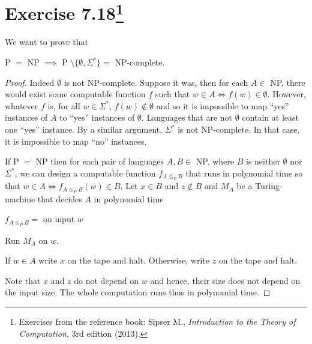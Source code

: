 \section{\texorpdfstring{Exercise 7.18\footnote{%
Exercises from the reference book: Sipser M.,
\emph{Introduction to the Theory of Computation}, 3rd edition
(2013).}}{Exercise 7.18}}

We want to prove that
\begin{theorem}
P \(=\) NP \(\implies\) P \(\setminus \{\emptyset, \Sigma^*\} =\) NP-complete.
\end{theorem}
\begin{proof}
	Indeed \(\emptyset\) is not NP-complete. Suppose it was, then for each
	\(A \in\) NP, there would
	exist some computable function \(f\) such that \(w \in A \iff f(w) \in
	\emptyset\). However, whatever \(f\) is, for all \(w \in \Sigma^*\), \(f(w) \not\in
\emptyset\) and so it is impossible to map ``yes'' instances of \(A\) to
``yes'' instances of \(\emptyset\). Languages that are not \(\emptyset\)
contain at least one ``yes'' instance. By a similar argument, \(\Sigma^*\) is
not NP-complete. In that case, it is impossible to map ``no'' instances.

If P \(=\) NP then for each pair of languages \(A, B \in\) NP, where \(B\) is
neither \(\emptyset\) nor \(\Sigma^*\), we can design a computable function
\(f_{A \le_P B}\) that runs in polynomial time so that \(w \in A \iff f_{A
\le_P B}(w) \in B\). Let \(x \in B\) and \(z \not\in B\) and \(M_A\) be a
Turing-machine that decides \(A\) in polynomial time
\begin{TMachine}{\(f_{A \le_P B} =\) on input \(w\)}
\item[1.] Run \(M_A\) on \(w\).
\item[2.] If \(w \in A\) write \(x\) on the tape and halt. Otherwise, write
\(z\) on the tape and halt.
\end{TMachine}
Note that \(x\) and \(z\) do not depend on \(w\) and hence, their size does not
depend on the input size. The whole computation runs thus in polynomial time.

\end{proof}
